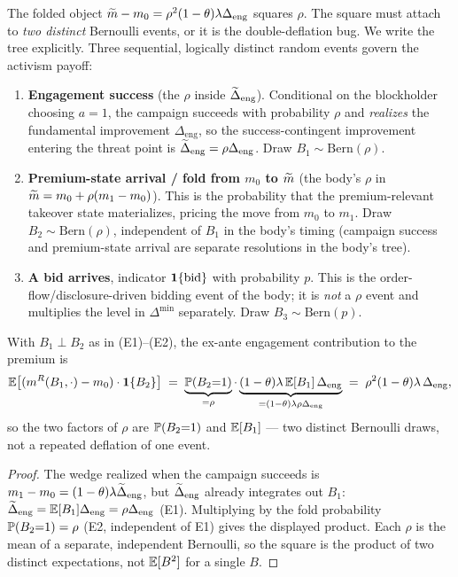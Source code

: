 The folded object $\widetilde{m}-m_{0}=\rho^{2}(1-\theta)\lambda\Delta_{\mathrm{eng}}$
squares $\rho$. The square must attach to \emph{two distinct} Bernoulli events,
or it is the double-deflation bug. We write the tree explicitly. Three sequential,
logically distinct random events govern the activism payoff:
\begin{enumerate}[label=(E\arabic*),leftmargin=2.6em]
\item \textbf{Engagement success} (the $\rho$ inside $\widetilde{\Delta}_{\mathrm{eng}}$).
  Conditional on the blockholder choosing $a=1$, the campaign succeeds with
  probability $\rho$ and \emph{realizes} the fundamental improvement
  $\Delta_{\mathrm{eng}}$, so the success-contingent improvement entering the
  threat point is $\widetilde{\Delta}_{\mathrm{eng}}=\rho\Delta_{\mathrm{eng}}$. Draw
  $B_{1}\sim\mathrm{Bern}(\rho)$.
\item \textbf{Premium-state arrival / fold from $m_{0}$ to $\widetilde{m}$} (the body's
  $\rho$ in $\widetilde{m}=m_{0}+\rho(m_{1}-m_{0})$). This is the probability that the
  premium-relevant takeover state materializes, pricing the move from $m_{0}$ to
  $m_{1}$. Draw $B_{2}\sim\mathrm{Bern}(\rho)$, independent of $B_{1}$ in the
  body's timing (campaign success and premium-state arrival are separate
  resolutions in the body's tree).
\item \textbf{A bid arrives}, indicator $\mathbf{1}\{\text{bid}\}$ with probability $p$.
  This is the order-flow/disclosure-driven bidding event of the body; it is
  \emph{not} a $\rho$ event and multiplies the level in $\Delta^{\min}$
  separately. Draw $B_{3}\sim\mathrm{Bern}(p)$.
\end{enumerate}

\begin{lemma}
\label{lem:bg-tree}
With $B_{1}\perp B_{2}$ as in \textup{(E1)--(E2)}, the ex-ante engagement
contribution to the premium is
\[
  \mathbb{E}\bigl[(m^{R}(B_{1},\cdot)-m_{0})\cdot\mathbf{1}\{B_{2}\}\bigr]
   \;=\;\underbrace{\mathbb{P}(B_{2}{=}1)}_{=\rho}\cdot
        \underbrace{(1-\theta)\lambda\,\mathbb{E}[B_{1}]\,\Delta_{\mathrm{eng}}}_{=(1-\theta)\lambda\rho\Delta_{\mathrm{eng}}}
   \;=\;\rho^{2}(1-\theta)\lambda\,\Delta_{\mathrm{eng}},
\]
so the two factors of $\rho$ are $\mathbb{P}(B_{2}{=}1)$ and $\mathbb{E}[B_{1}]$ --- two distinct
Bernoulli draws, not a repeated deflation of one event.
\end{lemma}
\begin{proof}
The wedge realized when the campaign succeeds is
$m_{1}-m_{0}=(1-\theta)\lambda\widetilde{\Delta}_{\mathrm{eng}}$, but $\widetilde{\Delta}_{\mathrm{eng}}$
already integrates out $B_{1}$:
$\widetilde{\Delta}_{\mathrm{eng}}=\mathbb{E}[B_{1}]\Delta_{\mathrm{eng}}=\rho\Delta_{\mathrm{eng}}$
(E1). Multiplying by the fold probability $\mathbb{P}(B_{2}{=}1)=\rho$ (E2, independent
of E1) gives the displayed product. Each $\rho$ is the mean of a separate,
independent Bernoulli, so the square is the product of two distinct expectations,
not $\mathbb{E}[B^{2}]$ for a single $B$.
\end{proof}

